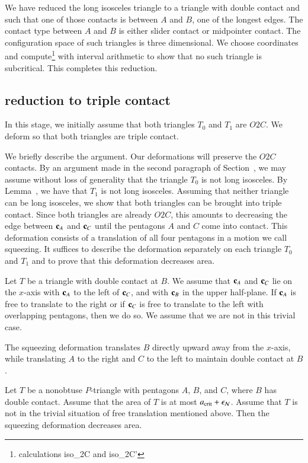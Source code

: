 We have reduced the long isosceles triangle to a triangle with double
contact and such that one of those contacts is between $A$ and $B$,
one of the longest edges.  The contact type between $A$ and $B$ is
either slider contact or midpointer contact.  The configuration space
of such triangles is three dimensional.  We choose coordinates and
compute\footnote{calculations iso\_2C and iso\_2C'} with interval
arithmetic to show that no such triangle is subcritical.  This
completes this reduction.

\subsection{reduction to triple contact}

In this stage, we initially assume that both triangles $T_0$ and $T_1$
are $O2C$.  We deform so that both triangles are triple contact.

We briefly describe the argument.  Our deformations will preserve the
$O2C$ contacts.  By an argument made in the second paragraph of
Section~, we may assume without loss of generality that
the triangle $T_0$ is not long isosceles.  By
Lemma~, we have that $T_1$ is not long
isosceles.  Assuming that neither triangle can be long isosceles, we
show that both triangles can be brought into triple contact.  Since
both triangles are already $O2C$, this amounts to decreasing the edge
between ${\mathbf c}_A$ and ${\mathbf c}_C$ until the pentagons $A$ and $C$ come into
contact.  This deformation consists of a translation of all four
pentagons in a motion we call squeezing.  It suffices to describe the
deformation separately on each triangle $T_0$ and $T_1$ and to prove
that this deformation decreases area.

Let $T$ be a triangle with double contact at $B$.  We assume that
${\mathbf c}_A$ and ${\mathbf c}_C$ lie on the $x$-axis with ${\mathbf c}_A$ to the left of
${\mathbf c}_C$, and with ${\mathbf c}_B$ in the upper half-plane.  If ${\mathbf c}_A$ is free to
translate to the right or if ${\mathbf c}_C$ is free to translate to the left
with overlapping pentagons, then we do so.  We assume that we are not
in this trivial case.

The squeezing deformation translates $B$ directly upward away from the
$x$-axis, while translating $A$ to the right and $C$ to the left to
maintain double contact at $B$.

\begin{lemma}  
  Let $T$ be a nonobtuse $P$-triangle with pentagons $A$, $B$, and
  $C$, where $B$ has double contact.  Assume that the area of $T$ is
  at most $a_\text{crit}+\epsilon_{\mathcal N}$.  Assume that $T$ is not in the trivial
  situation of free translation mentioned above.  Then the squeezing
  deformation decreases area.
\end{lemma}

